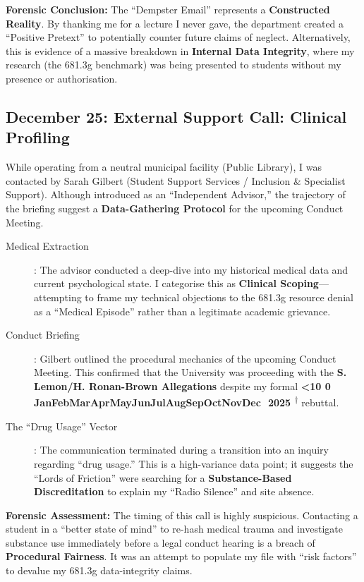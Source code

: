 \documentclass{EMBASSY}
\DeclareRobustCommand{\gmt}[3]{%
    \texorpdfstring{%
        {\color{DateGold}\textbf{%
            \ifnum#1<10 0\fi#1\,\textperiodcentered\,%
            \ifcase#2\or Jan\or Feb\or Mar\or Apr\or May\or Jun\or Jul\or Aug\or Sep\or Oct\or Nov\or Dec\fi
            \,\textperiodcentered\,20#3%
            \textsuperscript{$\dagger$}%
        }}%
    }{%
        (#1/#2/#3)%
    }%
}
\begin{document}
\noindent\textbf{Forensic Conclusion:} The ``Dempster Email'' represents a \textbf{Constructed Reality}. By thanking me for a lecture I never gave, the department created a ``Positive Pretext'' to potentially counter future claims of neglect. Alternatively, this is evidence of a massive breakdown in \textbf{Internal Data Integrity}, where my research (the 681.3g benchmark) was being presented to students without my presence or authorisation.

\subsection{December 25: External Support Call: Clinical Profiling}
While operating from a neutral municipal facility (Public Library), I was contacted by Sarah Gilbert (Student Support Services / Inclusion \& Specialist Support). Although introduced as an ``Independent Advisor,'' the trajectory of the briefing suggest a \textbf{Data-Gathering Protocol} for the upcoming Conduct Meeting.

\begin{description}
	\item[Medical Extraction]: The advisor conducted a deep-dive into my historical medical data and current psychological state. I categorise this as \textbf{Clinical Scoping}---attempting to frame my technical objections to the 681.3g resource denial as a ``Medical Episode'' rather than a legitimate academic grievance.
	\item[Conduct Briefing]: Gilbert outlined the procedural mechanics of the upcoming Conduct Meeting. This confirmed that the University was proceeding with the \textbf{S. Lemon/H. Ronan-Brown Allegations} despite my formal \gmt{9}{11}{25} rebuttal.
	\item[The ``Drug Usage'' Vector]: The communication terminated during a transition into an inquiry regarding ``drug usage.'' This is a high-variance data point; it suggests the ``Lords of Friction'' were searching for a \textbf{Substance-Based Discreditation} to explain my ``Radio Silence'' and site absence.
\end{description}

\noindent\textbf{Forensic Assessment:} The timing of this call is highly suspicious. Contacting a student in a ``better state of mind'' to re-hash medical trauma and investigate substance use immediately before a legal conduct hearing is a breach of \textbf{Procedural Fairness}. It was an attempt to populate my file with ``risk factors'' to devalue my 681.3g data-integrity claims.
\end{document}
